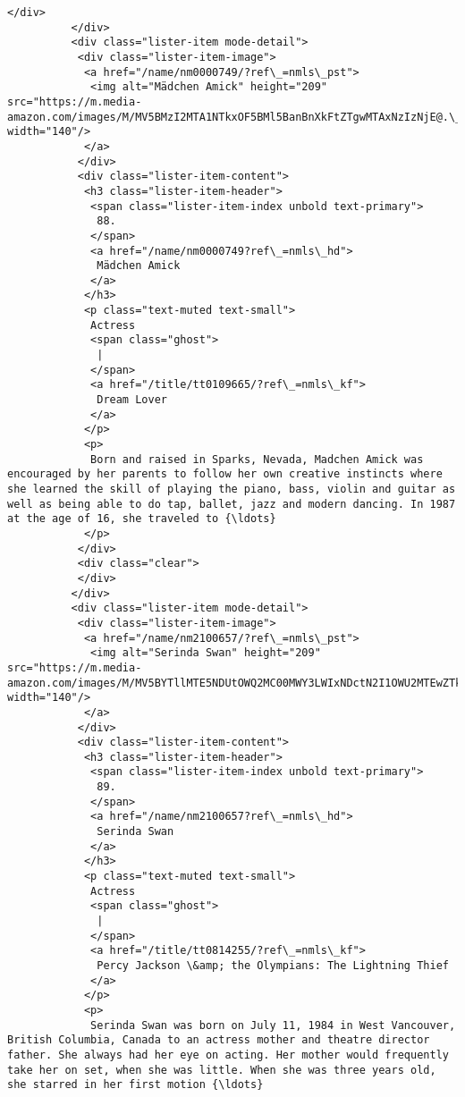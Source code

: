\documentclass[11pt]{article}
\begin{document}
\begin{Verbatim}[commandchars=\\\{\}]
           </div>
          </div>
          <div class="lister-item mode-detail">
           <div class="lister-item-image">
            <a href="/name/nm0000749/?ref\_=nmls\_pst">
             <img alt="Mädchen Amick" height="209" src="https://m.media-amazon.com/images/M/MV5BMzI2MTA1NTkxOF5BMl5BanBnXkFtZTgwMTAxNzIzNjE@.\_V1\_UX140\_CR0,0,140,209\_AL\_.jpg" width="140"/>
            </a>
           </div>
           <div class="lister-item-content">
            <h3 class="lister-item-header">
             <span class="lister-item-index unbold text-primary">
              88.
             </span>
             <a href="/name/nm0000749?ref\_=nmls\_hd">
              Mädchen Amick
             </a>
            </h3>
            <p class="text-muted text-small">
             Actress
             <span class="ghost">
              |
             </span>
             <a href="/title/tt0109665/?ref\_=nmls\_kf">
              Dream Lover
             </a>
            </p>
            <p>
             Born and raised in Sparks, Nevada, Madchen Amick was encouraged by her parents to follow her own creative instincts where she learned the skill of playing the piano, bass, violin and guitar as well as being able to do tap, ballet, jazz and modern dancing. In 1987 at the age of 16, she traveled to {\ldots}
            </p>
           </div>
           <div class="clear">
           </div>
          </div>
          <div class="lister-item mode-detail">
           <div class="lister-item-image">
            <a href="/name/nm2100657/?ref\_=nmls\_pst">
             <img alt="Serinda Swan" height="209" src="https://m.media-amazon.com/images/M/MV5BYTllMTE5NDUtOWQ2MC00MWY3LWIxNDctN2I1OWU2MTEwZTk5XkEyXkFqcGdeQXVyMzg3Nzk5MDI@.\_V1\_UY209\_CR23,0,140,209\_AL\_.jpg" width="140"/>
            </a>
           </div>
           <div class="lister-item-content">
            <h3 class="lister-item-header">
             <span class="lister-item-index unbold text-primary">
              89.
             </span>
             <a href="/name/nm2100657?ref\_=nmls\_hd">
              Serinda Swan
             </a>
            </h3>
            <p class="text-muted text-small">
             Actress
             <span class="ghost">
              |
             </span>
             <a href="/title/tt0814255/?ref\_=nmls\_kf">
              Percy Jackson \&amp; the Olympians: The Lightning Thief
             </a>
            </p>
            <p>
             Serinda Swan was born on July 11, 1984 in West Vancouver, British Columbia, Canada to an actress mother and theatre director father. She always had her eye on acting. Her mother would frequently take her on set, when she was little. When she was three years old, she starred in her first motion {\ldots}

\end{Verbatim}
\end{document}
